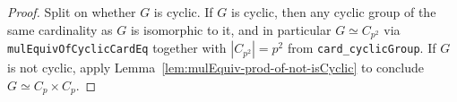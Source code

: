 \begin{proof}
  Split on whether $G$ is cyclic. If $G$ is cyclic, then any cyclic group of
  the same cardinality as $G$ is isomorphic to it, and in particular
  $G \simeq C_{p^2}$ via \texttt{mulEquivOfCyclicCardEq} together with
  $|C_{p^2}| = p^2$ from \texttt{card\_cyclicGroup}. If $G$ is not cyclic,
  apply Lemma~\ref{lem:mulEquiv-prod-of-not-isCyclic} to conclude $G \simeq
  C_p \times C_p$.
\end{proof}


